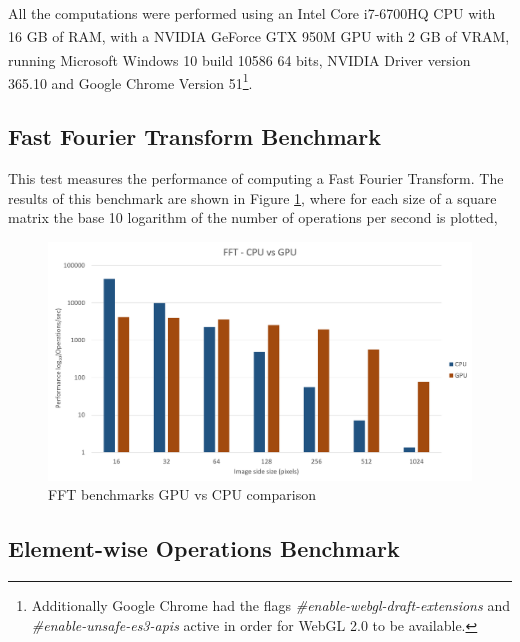     All the computations were performed using an Intel\textsuperscript{\textregistered} Core\textsuperscript{\texttrademark} i7-6700HQ CPU with 16 GB of RAM, with a NVIDIA\textsuperscript{\textregistered} GeForce\textsuperscript{\textregistered} GTX 950M GPU with 2 GB of VRAM, running Microsoft\textsuperscript{\textregistered} Windows\textsuperscript{\textregistered} 10 build 10586 64 bits, NVIDIA Driver version 365.10 and Google Chrome Version 51\footnote{Additionally Google Chrome had the flags \textit{\#enable-webgl-draft-extensions} and \textit{\#enable-unsafe-es3-apis} active in order for WebGL 2.0 to be available.}.
    
    \subsection{Fast Fourier Transform Benchmark}
    
      This test measures the performance of computing a Fast Fourier Transform. The results of this benchmark are shown in Figure \ref{fig:plot-fft}, where for each size of a square matrix the base 10 logarithm of the number of operations per second is plotted, 
    
      \begin{figure}[H]
      	\centering
      	\includegraphics[width=\plotwidth]{images/results/benchmarks/plot-fft}
      	\caption{FFT benchmarks GPU vs CPU comparison}
      	\label{fig:plot-fft}
      \end{figure}
      
    \subsection{Element-wise Operations Benchmark}
    
